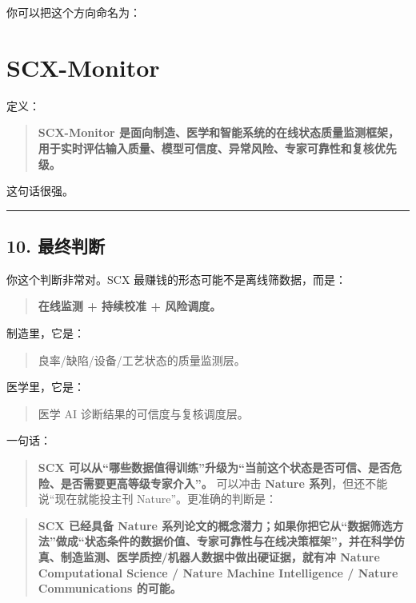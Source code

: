 \documentclass[
  12pt,
]{ctexart}
\begin{document}
你可以把这个方向命名为：

\section{\texorpdfstring{\textbf{SCX-Monitor}}{SCX-Monitor}}\label{scx-monitor-1}

定义：

\begin{quote}
\textbf{SCX-Monitor
是面向制造、医学和智能系统的在线状态质量监测框架，用于实时评估输入质量、模型可信度、异常风险、专家可靠性和复核优先级。}
\end{quote}

这句话很强。

\begin{center}\rule{0.5\linewidth}{0.5pt}\end{center}

\subsection{10. 最终判断}\label{ux6700ux7ec8ux5224ux65ad-4}

你这个判断非常对。SCX 最赚钱的形态可能不是离线筛数据，而是：

\begin{quote}
\textbf{在线监测 + 持续校准 + 风险调度。}
\end{quote}

制造里，它是：

\begin{quote}
良率/缺陷/设备/工艺状态的质量监测层。
\end{quote}

医学里，它是：

\begin{quote}
医学 AI 诊断结果的可信度与复核调度层。
\end{quote}

一句话：

\begin{quote}
\textbf{SCX
可以从``哪些数据值得训练''升级为``当前这个状态是否可信、是否危险、是否需要更高等级专家介入''。}
可以冲击 \textbf{Nature 系列}，但还不能说``现在就能投主刊
Nature''。更准确的判断是：
\end{quote}

\begin{quote}
\textbf{SCX 已经具备 Nature
系列论文的概念潜力；如果你把它从``数据筛选方法''做成``状态条件的数据价值、专家可靠性与在线决策框架''，并在科学仿真、制造监测、医学质控/机器人数据中做出硬证据，就有冲
Nature Computational Science / Nature Machine Intelligence / Nature
Communications 的可能。}
\end{quote}
\end{document}
